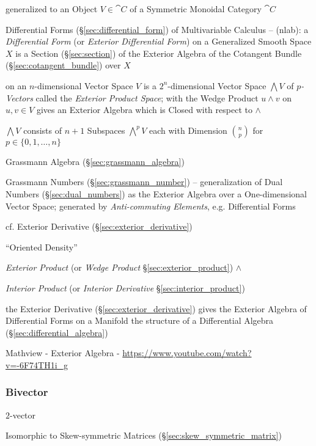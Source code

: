 {{generalized to an Object $V \in \cat{C}$ of a Symmetric Monoidal Category
$\cat{C}$

\fist Differential Forms (\S\ref{sec:differential_form}) of Multivariable
Calculus -- (nlab): a \emph{Differential Form} (or \emph{Exterior Differential
  Form}) on a Generalized Smooth Space $X$ is a Section (\S\ref{sec:section}) of
the Exterior Algebra of the Cotangent Bundle (\S\ref{sec:cotangent_bundle}) over
$X$

\asterism

on an $n$-dimensional Vector Space $V$ is a $2^n$-dimensional Vector Space
$\bigwedge V$ of \emph{$p$-Vectors} called the \emph{Exterior Product Space};
with the Wedge Product $u \wedge v$ on $u,v \in V$ gives an Exterior Algebra
which is Closed with respect to $\wedge$

$\bigwedge V$ consists of $n+1$ Subspaces $\bigwedge^p{V}$ each with Dimension
$\binom{n}{p}$ for $p \in \{0, 1, \ldots, n\}$

Grassmann Algebra (\S\ref{sec:grassmann_algebra})

\fist Grassmann Numbers (\S\ref{sec:grassmann_number}) -- generalization of Dual
Numbers (\S\ref{sec:dual_numbers}) as the Exterior Algebra over a
One-dimensional Vector Space; generated by \emph{Anti-commuting Elements}, e.g.
Differential Forms

\fist cf. Exterior Derivative (\S\ref{sec:exterior_derivative}) %

``Oriented Density'' %

\emph{Exterior Product} (or \emph{Wedge Product} \S\ref{sec:exterior_product})
$\wedge$

\emph{Interior Product} (or \emph{Interior Derivative}
\S\ref{sec:interior_product})

the Exterior Derivative (\S\ref{sec:exterior_derivative}) gives the Exterior
Algebra of Differential Forms on a Manifold the structure of a Differential
Algebra (\S\ref{sec:differential_algebra})

\asterism

Mathview - Exterior Algebra - \url{https://www.youtube.com/watch?v=-6F74TH1i_g}



\subsubsection{Bivector}\label{sec:bivector}

$2$-vector

Isomorphic to Skew-symmetric Matrices (\S\ref{sec:skew_symmetric_matrix})

}}

